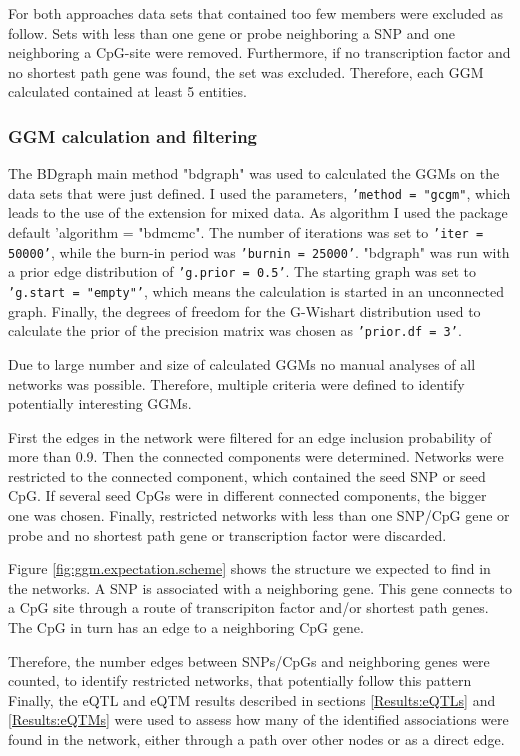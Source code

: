 \documentclass[a4paper,12pt,twoside,openright]{article}
\begin{document}
For both approaches data sets that contained too few members were excluded as follow. Sets with less than one gene or probe neighboring a SNP and one neighboring a CpG-site were removed. Furthermore, if no transcription factor and no shortest path gene was found, the set was excluded. Therefore, each GGM calculated contained at least 5 entities.

\subsubsection{GGM calculation and filtering}
\label{Methods:GGM calculation and filtering}
The BDgraph main method "bdgraph" was used to calculated the GGMs on the data sets that were just defined. I used the parameters, \texttt{'method = "gcgm"}, which leads to the use of the extension for mixed data. As algorithm I used the package default 'algorithm = "bdmcmc". The number of iterations was set to \texttt{'iter = 50000'}, while the burn-in period was \texttt{'burnin = 25000'}. "bdgraph" was run with a prior edge distribution of \texttt{'g.prior = 0.5'}. The starting graph was set to \texttt{'g.start = "empty"'}, which means the calculation is started in an unconnected graph. Finally, the degrees of freedom for the G-Wishart distribution used to calculate the prior of the precision matrix was chosen as \texttt{'prior.df = 3'}.

Due to large number and size of calculated GGMs no manual analyses of all networks was possible. Therefore, multiple criteria were defined to identify potentially interesting GGMs.

First the edges in the network were filtered for an edge inclusion probability of more than 0.9. Then the connected components were determined. Networks were restricted to the connected component, which contained the seed SNP or seed CpG. If several seed CpGs were in different connected components, the bigger one was chosen. Finally, restricted networks with less than one SNP/CpG gene or probe and no shortest path gene or transcription factor were discarded. 

Figure \ref{fig:ggm.expectation.scheme} shows the structure we expected to find in the networks. A SNP is associated with a neighboring gene. This gene connects to a CpG site through a route of transcripiton factor and/or shortest path genes. The CpG in turn has an edge to a neighboring CpG gene. 

Therefore, the number edges between SNPs/CpGs and neighboring genes were counted, to identify restricted networks, that potentially follow this pattern Finally, the eQTL and eQTM results described in sections \ref{Results:eQTLs} and \ref{Results:eQTMs} were used to assess how many of the identified associations were found in the network, either through a path over other nodes or as a direct edge. 
\end{document}
